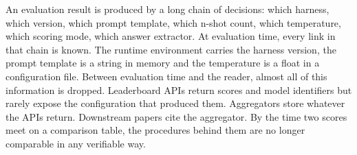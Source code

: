 \documentclass[11pt]{article}
\begin{document}
%
%
An evaluation result is produced by a long chain of decisions: which
harness, which version, which prompt template, which n-shot count, which
temperature, which scoring mode, which answer extractor. At evaluation
time, every link in that chain is known. The runtime environment carries
the harness version, the prompt template is a string in memory and the
temperature is a float in a configuration file. Between evaluation time
and the reader, almost all of this information is dropped. Leaderboard
APIs return scores and model identifiers but rarely expose the
configuration that produced them. Aggregators store whatever the APIs
return. Downstream papers cite the aggregator. By the time two scores
meet on a comparison table, the procedures behind them are no longer
comparable in any verifiable way.
\end{document}
